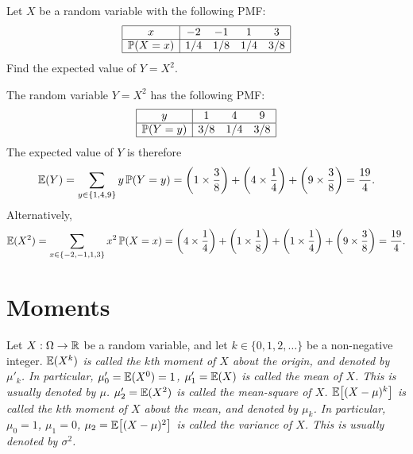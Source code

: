 \begin{example}
Let $X$ be a random variable with the following PMF:
\[\begin{array}{|c|cccc|}\hline
x 			& -2		& -1		& 1		& 3	\\ \hline
\mathbb{P}(X=x)	& 1/4	& 1/8	& 1/4	& 3/8 \\ \hline
\end{array}\]
Find the expected value of $Y=X^2$.
\end{example}

\begin{solution}
The random variable $Y=X^2$ has the following PMF:
\[\begin{array}{|c|ccc|}\hline
y			& 1		& 4		& 9	\\ \hline
\mathbb{P}(Y=y)	& 3/8	& 1/4	& 3/8	\\ \hline
\end{array}\]
The expected value of $Y$ is therefore
\[
\mathbb{E}(Y) 
	= \sum_{y\in\{1,4,9\}} y\,\mathbb{P}(Y=y) 
	= \left(1\times\frac{3}{8}\right) + \left(4\times\frac{1}{4}\right) + \left(9\times\frac{3}{8}\right) 
	= \frac{19}{4}.
\]
Alternatively,
\[
\mathbb{E}(X^2)
	= \sum_{x\in\{-2,-1,1,3\}} x^2\,\mathbb{P}(X=x) 
	= \left(4\times\frac{1}{4}\right) + \left(1\times\frac{1}{8}\right) + \left(1\times\frac{1}{4}\right) + \left(9\times\frac{3}{8}\right) 
	= \frac{19}{4}.
\]
\end{solution}


\section{Moments} 

\begin{definition}
Let $X:\Omega\to\mathbb{R}$ be a random variable, and let $k\in\{0,1,2,\ldots\}$ be a non-negative integer.
\ben
\it $\mathbb{E}(X^k)$ is called the \emph{$k$th moment of $X$ about the origin}, and denoted by $\mu'_k$.
In particular,
	\bit
	\it $\mu'_0 = \mathbb{E}(X^0) = 1$,
	\it $\mu'_1 = \mathbb{E}(X)$ is called the \emph{mean} of $X$. This is usually denoted by $\mu$.
	\it $\mu'_2 = \mathbb{E}(X^2)$ is called the \emph{mean-square} of $X$.
	\eit
\it $\mathbb{E}\big[(X-\mu)^k\big]$ is called the \emph{$k$th moment of $X$ about the mean}, and denoted by $\mu_k$.
In particular,
	\bit
	\it $\mu_0 = 1$,
	\it $\mu_1 = 0$,
	\it $\mu_2 = \mathbb{E}\big[(X-\mu)^2\big]$ is called the \emph{variance} of $X$. This is usually denoted by $\sigma^2$.
	\eit
\een
\end{definition}

